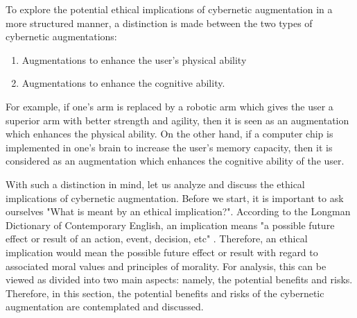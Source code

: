 To explore the potential ethical implications of cybernetic augmentation in a more structured manner, a distinction is made between the two types of cybernetic augmentations: 
\begin{enumerate}
	\item Augmentations to enhance the user's physical ability
	\item Augmentations to enhance the cognitive ability.
\end{enumerate}
For example, if one's arm is replaced by a robotic arm which gives the user a superior arm with better strength and agility, then it is seen as an augmentation which enhances the physical ability. On the other hand, if a computer chip is implemented in one's brain to increase the user's memory capacity, then it is considered as an augmentation which enhances the cognitive ability of the user. 

With such a distinction in mind, let us analyze and discuss the ethical implications of cybernetic augmentation. Before we start, it is important to ask ourselves "What is meant by an ethical implication?". According to the Longman Dictionary of Contemporary English, an implication means "a possible future effect or result of an action, event, decision, etc" \cite{Longman_dic}. Therefore, an ethical implication would mean the possible future effect or result with regard to associated moral values and principles of morality. For analysis, this can be viewed as divided into two main aspects: namely, the potential benefits and risks. Therefore, in this section, the potential benefits and risks of the cybernetic augmentation are contemplated and discussed.

